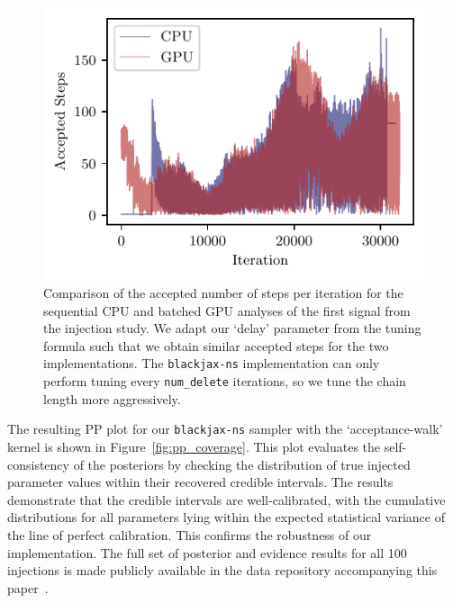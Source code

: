 \documentclass[fleqn,usenatbib]{mnras}
\begin{document}
\begin{figure}
    \centering
    \includegraphics{figures/chain_length_comparison.pdf}
    \caption{Comparison of the accepted number of steps per iteration for the sequential CPU and batched GPU analyses of
    the first signal from the injection study.
    We adapt our `delay' parameter from the tuning formula such that we obtain similar accepted steps for the 
    two implementations. The \texttt{blackjax-ns} implementation can only perform tuning every \mbox{\texttt{num\_delete}} iterations,
    so we tune the chain length more aggressively.}
    \label{fig:chain_length_comparison}
\end{figure}

The resulting PP plot for our \texttt{blackjax-ns} sampler
with the `acceptance-walk' kernel is shown in Figure~\ref{fig:pp_coverage}.
This plot evaluates the self-consistency of the posteriors by checking
the distribution of true injected parameter values within their
recovered credible intervals. The results demonstrate that the credible
intervals are well-calibrated, with the cumulative distributions for all
parameters lying within the expected statistical variance of the
line of perfect calibration. This confirms the robustness of our implementation. The full
set of posterior and evidence results for all 100 injections is made
publicly available in the data repository accompanying this paper~\citep{Prathaban_2025_zenodo}.
\end{document}
